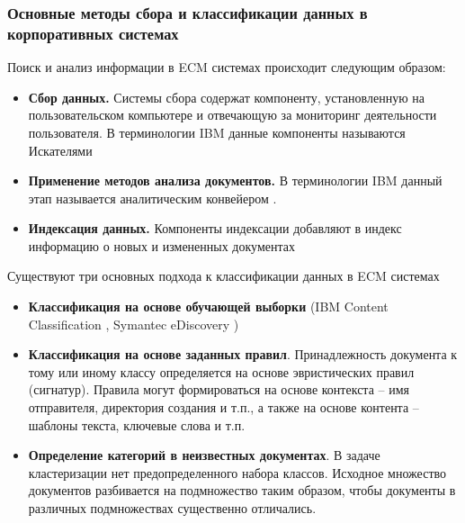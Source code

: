 \documentclass[russian, utf8, emptystyle]{eskdtext}
\begin{document}
\subsubsection{Основные методы сбора и классификации данных в корпоративных системах}
Поиск и анализ информации в ECM системах происходит следующим образом:
\begin{itemize}
	\item {\bf Сбор данных.} Системы сбора содержат компоненту, установленную на пользовательском компьютере и отвечающую за мониторинг деятельности пользователя. В терминологии IBM данные компоненты называются Искателями \cite{searcher}
	\item {\bf Применение методов анализа документов.} В терминологии IBM данный этап называется аналитическим конвейером \cite{analitic}.
	\item {\bf Индексация данных.} Компоненты индексации добавляют в индекс информацию о новых и измененных документах
	\cite{idx1,idx2,idx3}
\end{itemize}

Существуют три основных подхода к классификации данных в ECM системах
\begin{itemize}
	\item {\bf Классификация на основе обучающей выборки} (IBM Content Classification \cite{ContentClassification}, Symantec eDiscovery \cite{Symantec})
	\item {\bf Классификация на основе заданных правил}. Принадлежность документа к тому или иному классу определяется на основе эвристических правил (сигнатур). Правила могут формироваться на основе контекста – имя отправителя, директория создания и т.п., а также на основе контента – шаблоны текста, ключевые слова и т.п. 
	\item {\bf Определение категорий в неизвестных документах}.
	В задаче кластеризации нет предопределенного набора классов. Исходное множество документов разбивается на подмножество таким образом, чтобы документы в различных подмножествах существенно отличались.
\end{itemize}
\end{document}
